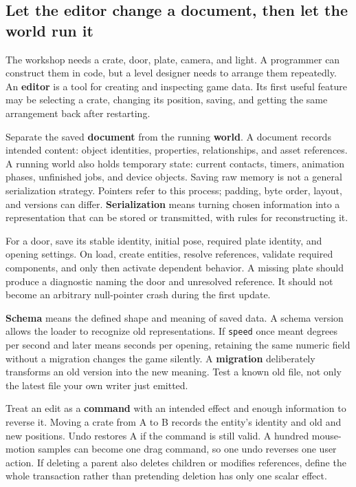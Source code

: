 \subsection{Let the editor change a document, then let the world run it}\label{06-engine-ii-ch032-let-the-editor-change-a-document-then-let-the-world-run-it}

The workshop needs a crate, door, plate, camera, and light. A programmer can construct them in code, but a level designer needs to arrange them repeatedly. An \textbf{editor} is a tool for creating and inspecting game data. Its first useful feature may be selecting a crate, changing its position, saving, and getting the same arrangement back after restarting.

Separate the saved \textbf{document} from the running \textbf{world}. A document records intended content: object identities, properties, relationships, and asset references. A running world also holds temporary state: current contacts, timers, animation phases, unfinished jobs, and device objects. Saving raw memory is not a general serialization strategy. Pointers refer to this process; padding, byte order, layout, and versions can differ. \textbf{Serialization} means turning chosen information into a representation that can be stored or transmitted, with rules for reconstructing it.

For a door, save its stable identity, initial pose, required plate identity, and opening settings. On load, create entities, resolve references, validate required components, and only then activate dependent behavior. A missing plate should produce a diagnostic naming the door and unresolved reference. It should not become an arbitrary null-pointer crash during the first update.

\textbf{Schema} means the defined shape and meaning of saved data. A schema version allows the loader to recognize old representations. If \texttt{speed} once meant degrees per second and later means seconds per opening, retaining the same numeric field without a migration changes the game silently. A \textbf{migration} deliberately transforms an old version into the new meaning. Test a known old file, not only the latest file your own writer just emitted.

Treat an edit as a \textbf{command} with an intended effect and enough information to reverse it. Moving a crate from A to B records the entity's identity and old and new positions. Undo restores A if the command is still valid. A hundred mouse-motion samples can become one drag command, so one undo reverses one user action. If deleting a parent also deletes children or modifies references, define the whole transaction rather than pretending deletion has only one scalar effect.

